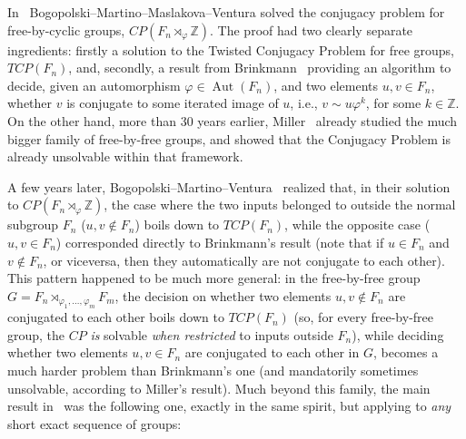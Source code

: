 \documentclass[english]{amsart}
\theoremstyle{definition}
\newcommand\ZZ{\mathbb{Z}}
\newcommand{\Aut}{\operatorname{Aut}}
\begin{document}
In~\cite{BMMV} Bogopolski--Martino--Maslakova--Ventura solved the conjugacy problem for free-by-cyclic groups, $CP(F_n\rtimes_{\varphi} \ZZ)$. The proof had two clearly separate ingredients: firstly a solution to the Twisted Conjugacy Problem for free groups, $TCP(F_n)$, and, secondly, a result from Brinkmann~\cite{B} providing an algorithm to decide, given an automorphism $\varphi\in \Aut(F_n)$, and two elements $u,v\in F_n$, whether $v$ is conjugate to some iterated image of $u$, i.e.,  $v\sim u\varphi^k$, for some $k\in \ZZ$. On the other hand, more than 30 years earlier, Miller~\cite{M} already studied the much bigger family of free-by-free groups, and showed that the Conjugacy Problem is already unsolvable within that framework. 

A few years later, Bogopolski--Martino--Ventura~\cite{BMV} realized that, in their solution to $CP(F_n\rtimes_{\varphi} \ZZ)$, the case where the two inputs belonged to outside the normal subgroup $F_n$ ($u,v\not\in F_n$) boils down to $TCP(F_n)$, while the opposite case ($u,v\in F_n$) corresponded directly to Brinkmann's result (note that if $u\in F_n$ and $v\not\in F_n$, or viceversa, then they automatically are not conjugate to each other). This pattern happened to be much more general: in the free-by-free group $G=F_n\rtimes_{\varphi_1,\ldots ,\varphi_m} F_m$, the decision on whether two elements $u,v\not\in F_n$ are conjugated to each other boils down to $TCP(F_n)$ (so, for every free-by-free group, the $CP$ \emph{is} solvable \emph{when restricted} to inputs outside $F_n$), while deciding whether two elements $u,v\in F_n$ are conjugated to each other in $G$, becomes a much harder problem than Brinkmann's one (and mandatorily sometimes unsolvable, according to Miller's result). Much beyond this family, the main result in~\cite{BMV} was the following one, exactly in the same spirit, but applying to \emph{any} short exact sequence of groups:
\end{document}
